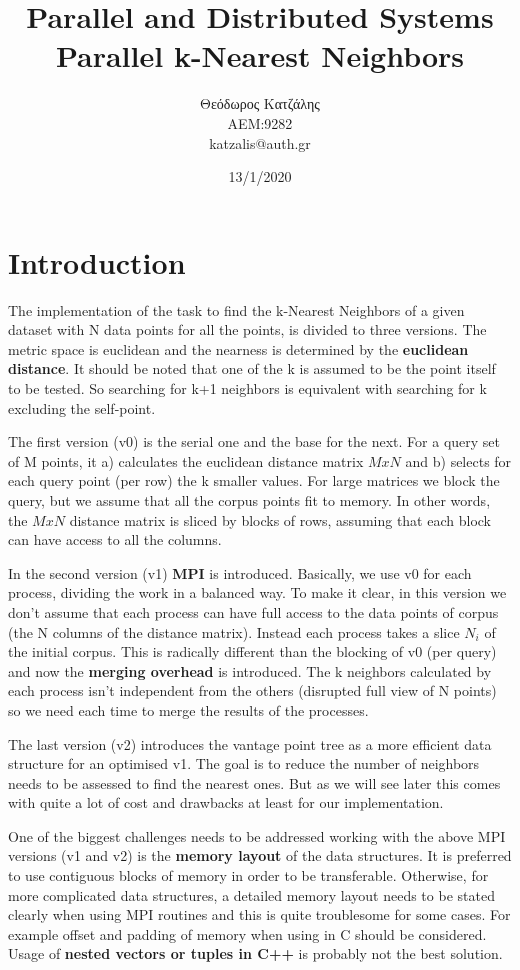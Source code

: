 \documentclass[12pt, a4paper]{article}
\title{\textbf{Parallel and Distributed Systems \\ Parallel k-Nearest Neighbors}}
\author{Θεόδωρος Κατζάλης \\ ΑΕΜ:9282 \\ katzalis@auth.gr}
\date{13/1/2020}
\begin{document}
\sloppy
%
\maketitle



\section{Introduction}

The implementation of the task to find the k-Nearest Neighbors of a given dataset with N data points for all the points, is divided to three versions. The metric space is euclidean and the nearness is determined by the \textbf{euclidean distance}. It should be noted that one of the k is assumed to be the point itself to be tested. So searching for k+1 neighbors is equivalent with searching for k excluding the self-point.

The first version (v0) is the serial one and the base for the next. For a query set of M points, it a) calculates the euclidean distance matrix $MxN$ and b) selects for each query point (per row) the k smaller values. For large matrices we block the query, but we assume that all the corpus points fit to memory. In other words, the $MxN$ distance matrix is sliced by blocks of rows, assuming that each block can have access to all the columns. 

In the second version (v1) \textbf{MPI} is introduced. Basically, we use v0 for each process, dividing the work in a balanced way. To make it clear, in this version we don't assume that each process can have full access to the data points of corpus (the N columns of the distance matrix). Instead each process takes a slice $N_i$ of the initial corpus. This is radically different than the blocking of v0 (per query) and now the \textbf{merging overhead} is introduced. The k neighbors calculated by each process isn't independent from the others (disrupted full view of N points) so we need each time to merge the results of the processes.

The last version (v2) introduces the vantage point tree as a more efficient data structure for an optimised v1. The goal is to reduce the number of neighbors needs to be assessed to find the nearest ones. But as we will see later this comes with quite a lot of cost and drawbacks at least for our implementation.

One of the biggest challenges needs to be addressed working with the above MPI versions (v1 and v2) is the \textbf{memory layout} of the data structures. It is preferred to use contiguous blocks of memory in order to be transferable. Otherwise, for more complicated data structures, a detailed memory layout needs to be stated clearly when using MPI routines and this is quite troublesome for some cases. For example offset and padding of memory when using  in C should be considered. Usage of \textbf{nested vectors or tuples in C++} is probably not the best solution.  
\end{document}
